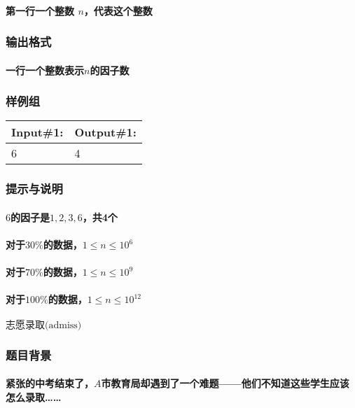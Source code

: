 \documentclass[final,11pt,oneside,UTF8]{report}
\begin{document}
\paragraph{第一行一个整数 $n$，代表这个整数}
\subsubsection{输出格式}
\paragraph{一行一个整数表示$n$的因子数}
\subsubsection{样例组}
\begin{table}[H]
    \begin{tabular}{|l|l|}
        \hline
        Input\#1: & Output\#1: \\ \hline
        6         & 4          \\ \hline
    \end{tabular}
\end{table}
\subsubsection{提示与说明}
\paragraph{$6$的因子是$1,2,3,6$，共4个}
\paragraph{对于$30\%$的数据，$1 \le n \le 10^6$}
\paragraph{对于$70\%$的数据，$1 \le n \le 10^9$}
\paragraph{对于$100\%$的数据，$1 \le n \le 10^{12}$}
\newpage

\centerline{\LARGE{$\textbf{志愿录取}\text{(admiss)}$}}
\subsubsection{题目背景}
\paragraph{
    紧张的中考结束了，$A$市教育局却遇到了一个难题——他们不知道这些学生应该怎么录取……
}
\end{document}

